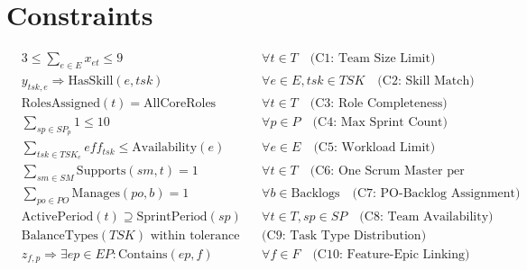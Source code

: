 \documentclass{article}
\begin{document}
\section*{Constraints}
\begin{align*}
& 3 \leq \sum_{e \in E} x_{et} \leq 9 && \forall t \in T \quad \text{(C1: Team Size Limit)} \\
& y_{tsk,e} \Rightarrow \text{HasSkill}(e,tsk) && \forall e \in E, tsk \in TSK \quad \text{(C2: Skill Match)} \\
& \text{RolesAssigned}(t) = \text{AllCoreRoles} && \forall t \in T \quad \text{(C3: Role Completeness)} \\
& \sum_{sp \in SP_p} 1 \leq 10 && \forall p \in P \quad \text{(C4: Max Sprint Count)} \\
& \sum_{tsk \in TSK_e} eff_{tsk} \leq \text{Availability}(e) && \forall e \in E \quad \text{(C5: Workload Limit)} \\
& \sum_{sm \in SM} \text{Supports}(sm,t) = 1 && \forall t \in T \quad \text{(C6: One Scrum Master per Team)} \\
& \sum_{po \in PO} \text{Manages}(po,b) = 1 && \forall b \in \text{Backlogs} \quad \text{(C7: PO-Backlog Assignment)} \\
& \text{ActivePeriod}(t) \supseteq \text{SprintPeriod}(sp) && \forall t \in T, sp \in SP \quad \text{(C8: Team Availability)} \\
& \text{BalanceTypes}(TSK) \text{ within tolerance} && \text{(C9: Task Type Distribution)} \\
& z_{f,p} \Rightarrow \exists ep \in EP : \text{Contains}(ep,f) && \forall f \in F \quad \text{(C10: Feature-Epic Linking)} \\
\end{align*}
\end{document}
